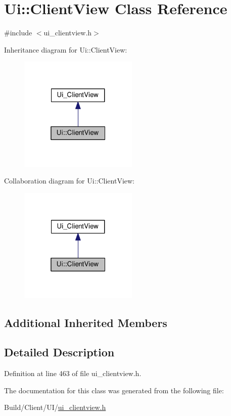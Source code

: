 \hypertarget{class_ui_1_1_client_view}{}\section{Ui\+:\+:Client\+View Class Reference}
\label{class_ui_1_1_client_view}


{\ttfamily \#include $<$ui\+\_\+clientview.\+h$>$}



Inheritance diagram for Ui\+:\+:Client\+View\+:
\nopagebreak
\begin{figure}[H]
\begin{center}
\leavevmode
\includegraphics[width=160pt]{class_ui_1_1_client_view__inherit__graph}
\end{center}
\end{figure}


Collaboration diagram for Ui\+:\+:Client\+View\+:
\nopagebreak
\begin{figure}[H]
\begin{center}
\leavevmode
\includegraphics[width=160pt]{class_ui_1_1_client_view__coll__graph}
\end{center}
\end{figure}
\subsection*{Additional Inherited Members}


\subsection{Detailed Description}


Definition at line 463 of file ui\+\_\+clientview.\+h.



The documentation for this class was generated from the following file\+:\begin{DoxyCompactItemize}
\item 
Build/\+Client/\+U\+I/\hyperlink{ui__clientview_8h}{ui\+\_\+clientview.\+h}\end{DoxyCompactItemize}
